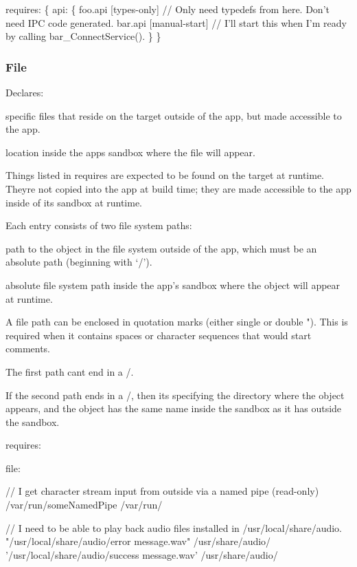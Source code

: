 \begin{DoxyCode}
requires:
\{
    api:
    \{
        foo.api [types-only]    \textcolor{comment}{// Only need typedefs from here.  Don't need IPC code generated.}
        bar.api [manual-start]  \textcolor{comment}{// I'll start this when I'm ready by calling bar\_ConnectService().}
    \}
\}
\end{DoxyCode}
\hypertarget{def_files_cdef_defFilesCdef_requiresFile}{}\subsubsection{File}\label{def_files_cdef_defFilesCdef_requiresFile}
Declares\+:
\begin{DoxyItemize}
\item specific files that reside on the target outside of the app, but made accessible to the app.
\item location inside the app\textquotesingle{}s sandbox where the file will appear.
\end{DoxyItemize}

Things listed in {\ttfamily requires} are expected to be found on the target at runtime. They\textquotesingle{}re not copied into the app at build time; they are made accessible to the app inside of its sandbox at runtime.

Each entry consists of two file system paths\+:


\begin{DoxyItemize}
\item path to the object in the file system outside of the app, which must be an absolute path (beginning with ‘/’).
\item absolute file system path inside the app’s sandbox where the object will appear at runtime.
\end{DoxyItemize}

A file path can be enclosed in quotation marks (either single \textquotesingle{} or double "). This is required when it contains spaces or character sequences that would start comments.

The first path can\textquotesingle{}t end in a \textquotesingle{}/\textquotesingle{}.

If the second path ends in a \textquotesingle{}/\textquotesingle{}, then it\textquotesingle{}s specifying the directory where the object appears, and the object has the same name inside the sandbox as it has outside the sandbox.

\begin{DoxyVerb}requires:
{
    file:
    {
        // I get character stream input from outside via a named pipe (read-only)
        /var/run/someNamedPipe  /var/run/

        // I need to be able to play back audio files installed in /usr/local/share/audio.
        "/usr/local/share/audio/error message.wav" /usr/share/audio/
        '/usr/local/share/audio/success message.wav' /usr/share/audio/
    }
}
\end{DoxyVerb}


